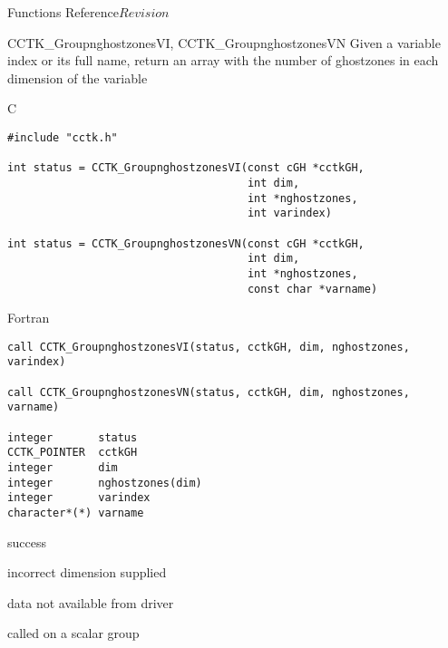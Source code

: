 \begin{cactuspart}{ Functions Reference}{}{$Revision$}
\begin{FunctionDescription}{CCTK\_GroupnghostzonesVI, CCTK\_GroupnghostzonesVN}
\label{CCTK-GroupnghostzonesVI}
\label{CCTK-GroupnghostzonesVN}
  Given a variable index or its full name, return an array with the number of ghostzones in each dimension of the variable

\begin{SynopsisSection}
\begin{Synopsis}{C}
\begin{verbatim}
#include "cctk.h"

int status = CCTK_GroupnghostzonesVI(const cGH *cctkGH,
                                     int dim,
                                     int *nghostzones,
                                     int varindex)

int status = CCTK_GroupnghostzonesVN(const cGH *cctkGH,
                                     int dim,
                                     int *nghostzones,
                                     const char *varname)
\end{verbatim}
\end{Synopsis}
\begin{Synopsis}{Fortran}
\begin{verbatim}
call CCTK_GroupnghostzonesVI(status, cctkGH, dim, nghostzones, varindex)

call CCTK_GroupnghostzonesVN(status, cctkGH, dim, nghostzones, varname)

integer       status
CCTK_POINTER  cctkGH
integer       dim
integer       nghostzones(dim)
integer       varindex
character*(*) varname
\end{verbatim}
\end{Synopsis}
\end{SynopsisSection}

\begin{ResultSection}
\begin{Result}{0} success \end{Result}
\begin{Result}{-1} incorrect dimension supplied \end{Result}
\begin{Result}{-2} data not available from driver \end{Result}
\begin{Result}{-3} called on a scalar group \end{Result}
\end{ResultSection}


\end{FunctionDescription}
\end{cactuspart}
